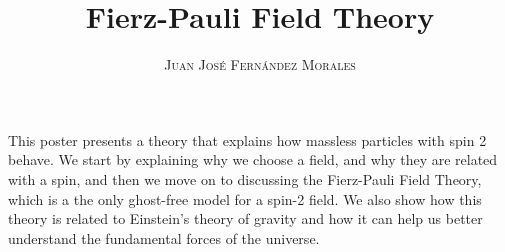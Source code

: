 \documentclass[a0,portrait]{a0poster} %
\title{\textbf{\Huge Fierz-Pauli Field Theory}} %
\author{\textsc{\huge Juan José Fernández Morales}} %
\date{} %
\begin{document}
\maketitle %
\begin{center}\Large
This poster presents a theory that explains how massless particles with spin 2 behave. We start by explaining why we choose a field, and why they are related with a spin, and then we move on to discussing the Fierz-Pauli Field Theory, which is a the only ghost-free model for a spin-2 field. We also show how this theory is related to Einstein's theory of gravity and how it can help us better understand the fundamental forces of the universe.%
\end{center}

\vspace{1cm}
\end{document}
